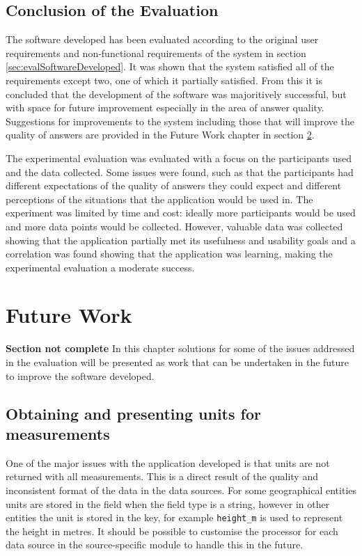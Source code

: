 \documentclass[authoryearcitations]{UoYCSproject}
\begin{document}
\section{Conclusion of the Evaluation}
\label{sec:conclusionOfEval}
The software developed has been evaluated according to the original user requirements and non-functional requirements of the system in section \ref{sec:evalSoftwareDeveloped}. It was shown that the system satisfied all of the requirements except two, one of which it partially satisfied. From this it is concluded that the development of the software was majoritively successful, but with space for future improvement especially in the area of answer quality. Suggestions for improvements to the system including those that will improve the quality of answers are provided in the Future Work chapter in section \ref{sec:extending}.

The experimental evaluation was evaluated with a focus on the participants used and the data collected. Some issues were found, such as that the participants had different expectations of the quality of answers they could expect and different perceptions of the situations that the application would be used in. The experiment was limited by time and cost: ideally more participants would be used and more data points would be collected. However, valuable data was collected showing that the application partially met its usefulness and usability  goals and a correlation was found showing that the application was learning, making the experimental evaluation a moderate success.


\newpage

\chapter{Future Work}
\label{sec:extending}
{\bf Section not complete}
In this chapter solutions for some of the issues addressed in the evaluation will be presented as work that can be undertaken in the future to improve the software developed.

\section{Obtaining and presenting units for measurements}
\label{sec:evalUnits}
One of the major issues with the application developed is that units are not returned with all measurements. This is a direct result of the quality and inconsistent format of the data in the data sources. For some geographical entities units are stored in the field when the field type is a string, however in other entities the unit is stored in the key, for example \texttt{height\_m} is used to represent the height in metres. It should be possible to customise the processor for each data source in the source-specific module to handle this in the future.
\end{document}
